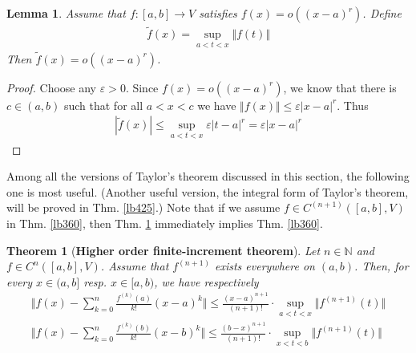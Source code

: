 \documentclass[12pt,b5paper,notitlepage]{article}
\theoremstyle{definition}
\theoremstyle{plain}
\newtheorem{thm}[df]{Theorem}
\newtheorem{lm}[df]{Lemma}
\newcommand{\wtd}{\widetilde}
\newcommand{\Nbb}{\mathbb N}
\newcommand{\eps}{\varepsilon}
\numberwithin{equation}{section}
\begin{document}
\begin{lm}
Assume that $f:[a,b]\rightarrow V$ satisfies $f(x)=o((x-a)^r)$. Define
\begin{align*}
\wtd f(x)=\sup_{a<t<x}\Vert f(t)\Vert
\end{align*}
Then $\wtd f(x)=o((x-a)^r)$.
\end{lm}


\begin{proof}
Choose any $\eps>0$. Since $f(x)=o((x-a)^r)$, we know that there is $c\in (a,b)$ such that for all $a<x<c$ we have $\Vert f(x)\Vert\leq \eps |x-a|^r$. Thus
\begin{align*}
|\wtd f(x)|\leq\sup_{a<t<x}\eps |t-a|^r =\eps|x-a|^r
\end{align*}
\end{proof}


Among all the versions of Taylor's theorem discussed in this section, the following one is most useful. (Another useful version, the integral form of Taylor's theorem, will be proved in Thm. \ref{lb425}.) Note that if we assume $f\in C^{(n+1)}([a,b],V)$ in Thm. \ref{lb360}, then Thm. \ref{lb359} immediately implies Thm. \ref{lb360}.  



\begin{thm}[\textbf{Higher order finite-increment theorem}]\label{lb359}
Let $n\in\Nbb$ and $f\in C^n([a,b],V)$. Assume that $f^{(n+1)}$ exists everywhere on $(a,b)$. Then, for every $x\in(a,b]$ resp. $x\in[a,b)$, we have respectively
\begin{subequations}
\begin{gather}
\Big\Vert f(x)-\sum_{k=0}^n\frac{f^{(k)}(a)}{k!}(x-a)^k \Big\Vert \leq \frac{(x-a)^{n+1}}{(n+1)!}\cdot \sup_{a<t<x}\Vert f^{(n+1)}(t)\Vert  \label{eq139}\\
\Big\Vert f(x)-\sum_{k=0}^n\frac{f^{(k)}(b)}{k!}(x-b)^k \Big\Vert \leq \frac{(b-x)^{n+1}}{(n+1)!}\cdot \sup_{x<t<b}\Vert f^{(n+1)}(t)\Vert
\end{gather}
\end{subequations} 
\end{thm}
\end{document}
